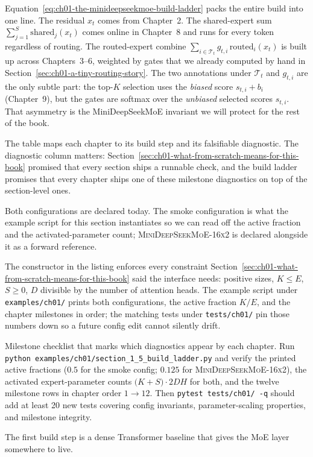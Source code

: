 

Equation~\ref{eq:ch01-the-minideepseekmoe-build-ladder} packs the entire build into one line. The residual $x_t$ comes from Chapter~2. The shared-expert sum $\sum_{j=1}^{S} \mathrm{shared}_j(x_t)$ comes online in Chapter~8 and runs for every token regardless of routing. The routed-expert combine $\sum_{i \in \mathcal{T}_t} g_{t,i}\,\mathrm{routed}_i(x_t)$ is built up across Chapters~3--6, weighted by gates that we already computed by hand in Section~\ref{sec:ch01-a-tiny-routing-story}. The two annotations under $\mathcal{T}_t$ and $g_{t,i}$ are the only subtle part: the top-$K$ selection uses the \emph{biased} score $s_{t,i} + b_i$ (Chapter~9), but the gates are softmax over the \emph{unbiased} selected scores $s_{t,i}$. That asymmetry is the MiniDeepSeekMoE invariant we will protect for the rest of the book.



The table maps each chapter to its build step and its falsifiable diagnostic. The diagnostic column matters: Section~\ref{sec:ch01-what-from-scratch-means-for-this-book} promised that every section ships a runnable check, and the build ladder promises that every chapter ships one of these milestone diagnostics on top of the section-level ones.

Both configurations are declared today. The smoke configuration is what the example script for this section instantiates so we can read off the active fraction and the activated-parameter count; \textsc{MiniDeepSeekMoE-16x2} is declared alongside it as a forward reference.



The constructor in the listing enforces every constraint Section~\ref{sec:ch01-what-from-scratch-means-for-this-book} said the interface needs: positive sizes, $K \le E$, $S \ge 0$, $D$ divisible by the number of attention heads. The example script under \texttt{examples/ch01/} prints both configurations, the active fraction $K/E$, and the chapter milestones in order; the matching tests under \texttt{tests/ch01/} pin those numbers down so a future config edit cannot silently drift.

\begin{checkpointbox}
Milestone checklist that marks which diagnostics appear by each chapter. Run \texttt{python examples/ch01/section\_1\_5\_build\_ladder.py} and verify the printed active fractions ($0.5$ for the smoke config; $0.125$ for \textsc{MiniDeepSeekMoE-16x2}), the activated expert-parameter counts $\bigl(K+S\bigr)\cdot 2 D H$ for both, and the twelve milestone rows in chapter order $1 \to 12$. Then \texttt{pytest tests/ch01/ -q} should add at least 20 new tests covering config invariants, parameter-scaling properties, and milestone integrity.
\end{checkpointbox}

The first build step is a dense Transformer baseline that gives the MoE layer somewhere to live.
